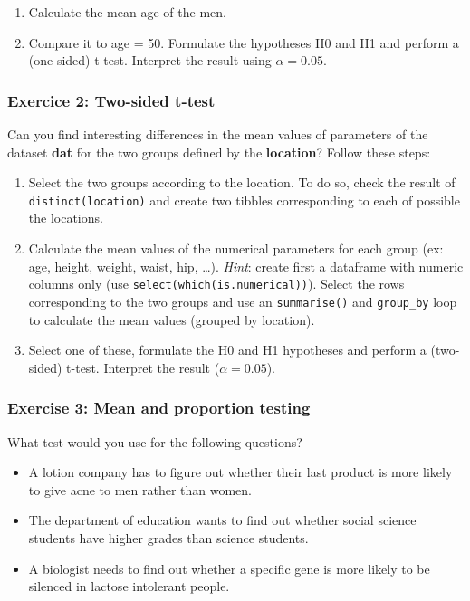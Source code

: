 \documentclass[
]{book}
\providecommand{\tightlist}{%
  \setlength{\itemsep}{0pt}\setlength{\parskip}{0pt}}
\begin{document}
\begin{enumerate}
\def\labelenumi{\arabic{enumi}.}
\setcounter{enumi}{1}
\tightlist
\item
  Calculate the mean age of the men.
\item
  Compare it to age = 50. Formulate the hypotheses H0 and H1 and perform a (one-sided) t-test. Interpret the result using \(\alpha=0.05\).
\end{enumerate}

\hypertarget{exercice-2-two-sided-t-test}{%
\subsubsection{Exercice 2: Two-sided t-test}\label{exercice-2-two-sided-t-test}}

Can you find interesting differences in the mean values of parameters of the dataset \textbf{dat} for the two groups defined by the \textbf{location}?
Follow these steps:

\begin{enumerate}
\def\labelenumi{\arabic{enumi}.}
\item
  Select the two groups according to the location.
  To do so, check the result of \texttt{distinct(location)} and create two tibbles corresponding to each of possible the locations.
\item
  Calculate the mean values of the numerical parameters for each group (ex: age, height, weight, waist, hip, \ldots).
  \emph{Hint}: create first a dataframe with numeric columns only (use \texttt{select(which(is.numerical))}).
  Select the rows corresponding to the two groups and use an \texttt{summarise()} and \texttt{group\_by} loop to calculate the mean values (grouped by location).
\item
  Select one of these, formulate the H0 and H1 hypotheses and perform a (two-sided) t-test.
  Interpret the result (\(\alpha=0.05\)).
\end{enumerate}

\hypertarget{exercise-3-mean-and-proportion-testing}{%
\subsubsection{Exercise 3: Mean and proportion testing}\label{exercise-3-mean-and-proportion-testing}}

What test would you use for the following questions?

\begin{itemize}
\tightlist
\item
  A lotion company has to figure out whether their last product is more likely to give acne to men rather than women.
\item
  The department of education wants to find out whether social science students have higher grades than science students.
\item
  A biologist needs to find out whether a specific gene is more likely to be silenced in lactose intolerant people.
\end{itemize}
\end{document}
